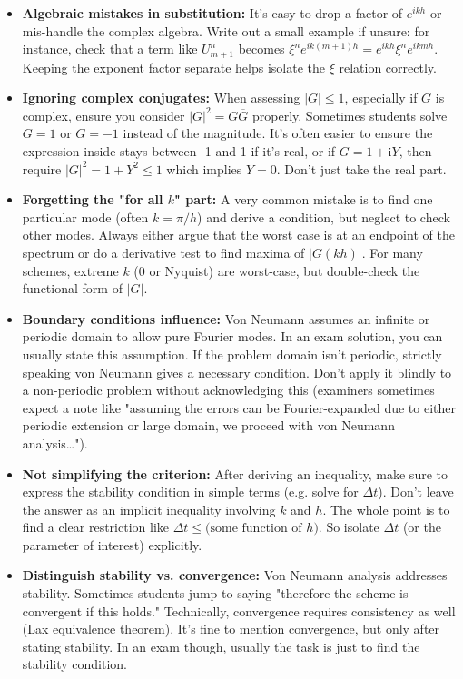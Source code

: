 \documentclass[a4paper,11pt]{report}
\begin{document}
\begin{itemize}
    \item \textbf{Algebraic mistakes in substitution:} It's easy to drop a factor of $e^{ikh}$ or mis-handle the complex algebra. Write out a small example if unsure: for instance, check that a term like $U^n_{m+1}$ becomes $\xi^n e^{ik(m+1)h} = e^{ikh} \xi^n e^{ikmh}$. Keeping the exponent factor separate helps isolate the $\xi$ relation correctly.

    \item \textbf{Ignoring complex conjugates:} When assessing $|G| \le 1$, especially if $G$ is complex, ensure you consider $|G|^2 = G \overline{G}$ properly. Sometimes students solve $G=1$ or $G=-1$ instead of the magnitude. It's often easier to ensure the expression inside stays between -1 and 1 if it's real, or if $G = 1 + \mathrm{i}Y$, then require $|G|^2 = 1 + Y^2 \le 1$ which implies $Y=0$. Don't just take the real part.

    \item \textbf{Forgetting the "for all $k$" part:} A very common mistake is to find one particular mode (often $k= \pi/h$) and derive a condition, but neglect to check other modes. Always either argue that the worst case is at an endpoint of the spectrum or do a derivative test to find maxima of $|G(kh)|$. For many schemes, extreme $k$ (0 or Nyquist) are worst-case, but double-check the functional form of $|G|$.

    \item \textbf{Boundary conditions influence:} Von Neumann assumes an infinite or periodic domain to allow pure Fourier modes. In an exam solution, you can usually state this assumption. If the problem domain isn't periodic, strictly speaking von Neumann gives a necessary condition. Don't apply it blindly to a non-periodic problem without acknowledging this (examiners sometimes expect a note like "assuming the errors can be Fourier-expanded due to either periodic extension or large domain, we proceed with von Neumann analysis…").

    \item \textbf{Not simplifying the criterion:} After deriving an inequality, make sure to express the stability condition in simple terms (e.g. solve for $\Delta t$). Don't leave the answer as an implicit inequality involving $k$ and $h$. The whole point is to find a clear restriction like $\Delta t \le \text{(some function of $h$)}$. So isolate $\Delta t$ (or the parameter of interest) explicitly.

    \item \textbf{Distinguish stability vs. convergence:} Von Neumann analysis addresses stability. Sometimes students jump to saying "therefore the scheme is convergent if this holds." Technically, convergence requires consistency as well (Lax equivalence theorem). It's fine to mention convergence, but only after stating stability. In an exam though, usually the task is just to find the stability condition.
\end{itemize}
\end{document}
